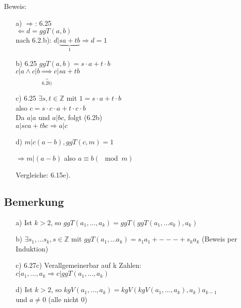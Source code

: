 \documentclass[a4paper, 12pt, twoside] {article}
\begin{document}
Beweis:

\begin{itemize}

\item[a)] $\Rightarrow$: 6.25 \\
$\Leftarrow d = ggT(a, b)$ \\
nach 6.2.b): $d | \underbrace{sa + tb}_{1} \Rightarrow d = 1$

\item[b)] 6.25 $ggT(a, b) = s \cdot a + t \cdot b$ \\
$c |a \wedge c | b \underbrace{\Rightarrow}_{6.2b)} c | sa + tb$

\item[c)] 6.25 $\exists s, t \in \mathbb{Z}$ mit $1 = s \cdot a + t \cdot b$ \\
also $c = s \cdot c \cdot a + t \cdot c \cdot b$ \\
Da $a | a$ und $a | bc$, folgt (6.2b) \\
$a | sca + tbc \Rightarrow a | c$

\item[d)] $m | c (a-b), ggT(c, m) = 1$

$\Rightarrow m | (a -b)$ also $a \equiv b (\mod m)$

Vergleiche: 6.15e).

\end{itemize}

\subsection{Bemerkung} %

\begin{itemize}

\item[a)] Ist $k > 2$, so $ggT(a_1, ..., a_k) = ggT(ggT(a_1, ...a_k), a_k)$

\item[b)] $\exists s_1, ... s_k, s \in \mathbb{Z}$ mit $ggT(a_1, ... a_k) = s_1 a_1 + --- + s_k a_k$ (Beweis per Induktion)

\item[c)] 6.27c) Verallgemeinerbar auf k Zahlen: \\
$c | a_1, ... , a_k \Rightarrow c | ggT(a_1, ... , a_k)$

\item[d)] Ist $k > 2$, so $kgV(a_1, ... , a_k) = kgV(kgV(a_1, ..., a_k), a_k) a_{k-1}$ \\
und $a \neq 0$ (alle nicht 0)

\end{itemize}
\end{document}
